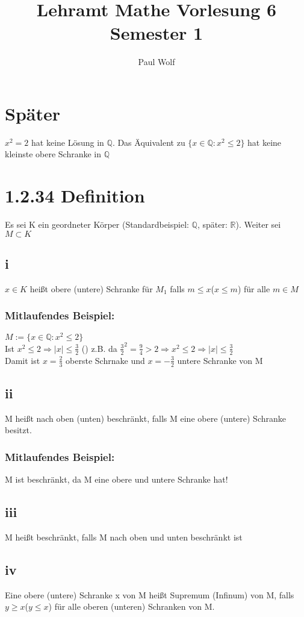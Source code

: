 \documentclass[11pt]{scrartcl}
\title{Lehramt Mathe Vorlesung 6 Semester 1 }
\author{Paul Wolf}
\begin{document}
\maketitle
\tableofcontents

\section{Später}
$x^2 = 2$ hat keine Lösung in $\mathbb{Q}$. Das Äquivalent  zu $\{x \in \mathbb{Q} : x^2 \leq 2\}$ hat keine kleinste obere Schranke in $\mathbb{Q}$
\section{1.2.34 Definition}
Es sei K ein geordneter Körper (Standardbeispiel: $\mathbb{Q}$, später: $\mathbb{R}$). Weiter sei $M \subset K$
\subsection{i}
$x \in K$ heißt obere (untere) Schranke
für $M_1$ falls $m \leq x$($x \leq m$) für alle $m \in M$
\subsubsection*{Mitlaufendes Beispiel:}
$M := \{ x \in \mathbb{Q} : x^2\leq 2\}$ \\
Ist $x^2 \leq 2 \Rightarrow \mid x \mid \leq \frac{3}{2}$ () z.B. da $\frac{3}{2}^2 = \frac{9}{4} > 2 \Rightarrow x^2 \leq 2 \Rightarrow \mid x \mid \leq \frac{3}{2}$ \\
Damit ist $x = \frac{2}{3}$ oberste Schrnake und $x = - \frac{3}{2}$ untere Schranke von M 
\subsection{ii}
M heißt nach oben (unten) beschränkt, falls M eine obere (untere) Schranke besitzt.
\subsubsection*{Mitlaufendes Beispiel:}
M ist beschränkt, da M eine obere und untere Schranke hat!
\subsection*{iii}
M heißt beschränkt, falls M nach oben und unten beschränkt ist
\subsection{iv}
Eine obere (untere)  Schranke x von M heißt Supremum (Infinum) von M, falls $y \geq x $($y \leq x$) für alle oberen (unteren) Schranken von M.
\end{document}
